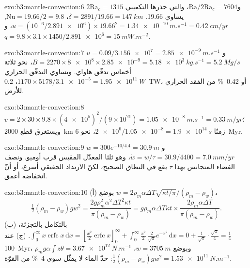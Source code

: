 \begin{solution}{exo:b3:mantle-convection:6}
$2\mathrm{Ra}_c = 1315$ و$\mathrm{Ra}/2\mathrm{Ra}_c = 7604$، والتي جذرها التكعيبي
يساوي 19.66. $\delta = 2891/19.66 = \qty{147}{km}$، $\mathrm{Nu} = 19.66/2 =
9.8$, $u = (10^{-6}/\num{2.891e6})\times19.66^2 = \qty{1.34e-10}{m.s^{-1}} =
\qty{0.42}{cm/yr}$، و$q = 9.8\times3.1\times1450/\num{2.891e6} =
\qty{15}{mW.m^{-2}}$.
\end{solution}

\begin{solution}{exo:b3:mantle-convection:7}
$u = 0.09/\num{3.156e7} = \qty{2.85e-9}{m.s^{-1}}$ و$B = 2270\times\num{8e8}
\times\num{2.85e-9} = \qty{5.18e3}{kg.s^{-1}} = \qty{5.2}{Mg/s}$، نحو
ثلاثة أخماس تدفّق هاواي. ويساوي التدفّق الحراري $1170\times5178/\num{3.1e-5} =
\qty{1.95e11}{W}$، \qty{0.2}{TW}، أو \qty{0.42}{\percent} من الفقد الحراري
للأرض.
\end{solution}

\begin{solution}{exo:b3:mantle-convection:8}
$v = 2\times30\times9.8\times(\num{4e5})^2/(9\times10^{21}) =
\qty{1.05e-8}{m.s^{-1}} = \qty{0.33}{m/yr}$؛ ويستغرق قطع \qty{2000}{km}
زمنًا $\num{2e6}/\num{1.05e-8} = \qty{1.9e14}{s}$، نحو \qty{6}{Myr}.
\end{solution}

\begin{solution}{exo:b3:mantle-convection:9}
$w = 300e^{-10/4.4} = \qty{30.9}{m}$ و$\dot w = w/\tau = 30.9/4400 =
\qty{7.0}{mm/yr}$، وهو ثلثا المعدّل المقيس قرب أوميو. ونصف الفضاء المتجانس
بهذا $\tau$ يقع في النطاق الصحيح، لكنّ الارتداد الحقيقي
أسرع، أو أنّ انخفاضه أعمق.
\end{solution}

\begin{solution}{exo:b3:mantle-convection:10}
(أ) بوضع $w = 2\rho_m\alpha\Delta T\sqrt{\kappa t/\pi}/(\rho_m - \rho_w)$،
\[
  \tfrac12(\rho_m - \rho_w)gw^2 = \frac{2g\rho_m^2\alpha^2\Delta T^2\kappa t}
  {\pi(\rho_m - \rho_w)} = g\rho_m\alpha\Delta T\kappa t\times
  \frac{2\rho_m\alpha\Delta T}{\pi(\rho_m - \rho_w)} .
\] (ب) بالتكامل بالتجزئة،
$\int_0^\infty x\operatorname{erfc}x\,\mathrm dx = [\tfrac{x^2}2\operatorname{erfc}
x]_0^\infty + \int_0^\infty\tfrac{x^2}2\,\tfrac2{\sqrt\pi}e^{-x^2}\,\mathrm dx =
0 + \tfrac1{\sqrt\pi}\cdot\tfrac{\sqrt\pi}4 = \tfrac14$. (ج) عند \qty{100}{Myr}،
$\rho_mg\alpha\int z\theta = \qty{3.67e12}{N.m^{-1}}$ وبوضع $w =
\qty{3705}{m}$، $\tfrac12(\rho_m - \rho_w)gw^2 = \qty{1.53e11}{N.m^{-1}}$: حدّ
الماء لا يمثّل سوى \qty{4}{\percent} من القوّة.
\end{solution}

